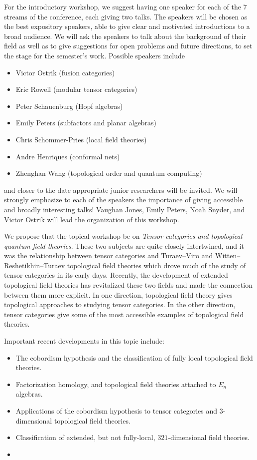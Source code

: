 \documentclass[12pt]{article}
\begin{document}
For the introductory workshop, we suggest having one speaker for each of the 7 streams of the conference, each giving two talks.
The speakers will be chosen as the best expository speakers, able to give clear and motivated introductions to a broad audience. We will ask the speakers to talk about the background of their field as well as to give suggestions for open problems and future directions, to set the stage for the semester's work. Possible speakers include
\begin{itemize}
  \setlength{\itemsep}{1pt}
  \setlength{\parskip}{0pt}
  \setlength{\parsep}{0pt}
\item Victor Ostrik (fusion categories) 
\item Eric Rowell (modular tensor categories)
\item Peter Schauenburg (Hopf algebras)
\item Emily Peters (subfactors and planar algebras) %
\item Chris Schommer-Pries (local field theories) %
\item Andre Henriques (conformal nets) %
\item Zhenghan Wang (topological order and quantum computing) %
\end{itemize}
and closer to the date appropriate junior researchers will be invited. 
We will strongly emphasize to each of the speakers the importance of giving accessible and broadly interesting talks!
Vaughan Jones, Emily Peters, Noah Snyder, and Victor Ostrik will lead the organization of this workshop.

We propose that the topical workshop be on \emph{Tensor categories and topological quantum field theories}. These two subjects are quite closely intertwined, and it was the relationship between tensor categories and Turaev--Viro and Witten--Reshetikhin--Turaev topological field theories which drove much of the study of tensor categories in its early days.  Recently, the development of extended topological field theories has revitalized these two fields and made the connection between them more explicit. In one direction, topological field theory gives topological approaches to studying tensor categories. In the other direction, tensor categories give some of the most accessible examples of topological field theories.

Important recent developments in this topic include:
\begin{itemize}
\item The cobordism hypothesis and the classification of fully local topological field theories.
\item Factorization homology, and topological field theories attached to $E_n$ algebras.
\item Applications of the cobordism hypothesis to tensor categories and $3$-dimensional topological field theories.
\item Classification of extended, but not fully-local, $321$-dimensional field theories.
\item 
\end{itemize}
\end{document}
